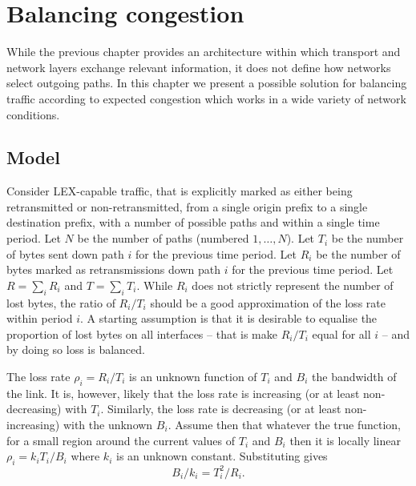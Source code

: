 \section{Balancing congestion}
While the previous chapter provides an architecture within which transport and network layers exchange relevant information, it does not define how networks select outgoing paths. 
In this chapter we present a possible solution for balancing traffic according to expected congestion which works in a wide variety of network conditions.

\subsection{Model}
Consider \ac{LEX}-capable traffic, that is explicitly marked as either being retransmitted or non-retransmitted, from a single origin prefix to a single destination prefix, with a number of possible paths and within a single time period.  
Let $N$ be the number of paths (numbered $1,\ldots,N$). 
Let $T_i$ be the number of bytes sent down path $i$ for the previous time period. 
Let $R_i$ be the number of bytes marked as retransmissions down path $i$ for the previous time period.  
Let $R=\sum_i R_i$ and $T=\sum_i T_i$.
While $R_i$ does not strictly represent the number of lost bytes, the ratio of $R_i/T_i$ should be a good approximation of the loss rate within period $i$.
A starting assumption is that it is desirable to equalise the proportion of lost bytes on all interfaces -- that is make $R_i/T_i$ equal for all $i$ -- and by doing so loss is balanced.

The loss rate $\rho_i = R_i/T_i$ is an unknown function of $T_i$ and $B_i$ the bandwidth of the link.  
It is, however, likely that the loss rate is increasing (or at least non-decreasing) with $T_i$.
Similarly, the loss rate is decreasing (or at least non-increasing) with the unknown $B_i$.
Assume then that whatever the true function, for a small region around the current values of $T_i$ and $B_i$ then it is locally linear $\rho_i = k_i T_i/B_i$ where $k_i$ is an unknown constant.
Substituting gives
\begin{equation}
B_i/k_i = T_i^2/R_i.
\label{eqn:bik}
\end{equation}

